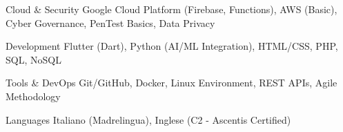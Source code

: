 
\begin{cvskills}
  \cvskill
    {Cloud \& Security}
    {Google Cloud Platform (Firebase, Functions), AWS (Basic), Cyber Governance, PenTest Basics, Data Privacy}

  \cvskill
    {Development}
    {Flutter (Dart), Python (AI/ML Integration), HTML/CSS, PHP, SQL, NoSQL}

  \cvskill
    {Tools \& DevOps}
    {Git/GitHub, Docker, Linux Environment, REST APIs, Agile Methodology}

  \cvskill
    {Languages}
    {Italiano (Madrelingua), Inglese (C2 - Ascentis Certified)}
\end{cvskills}